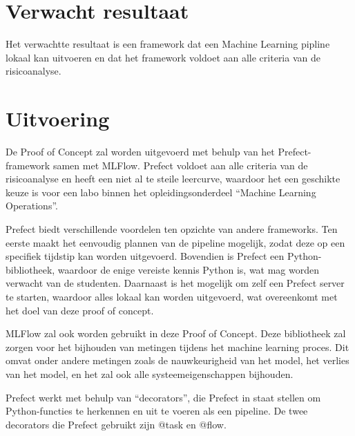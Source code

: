 \section{Verwacht resultaat}


Het verwachtte resultaat is een framework dat een Machine Learning pipline lokaal kan uitvoeren en dat het framework voldoet aan alle criteria van de risicoanalyse.

\section{Uitvoering}


De Proof of Concept zal worden uitgevoerd met behulp van het Prefect-framework samen met MLFlow. Prefect voldoet aan alle criteria van de risicoanalyse en heeft een niet al te steile leercurve, waardoor het een geschikte keuze is voor een labo binnen het opleidingsonderdeel ``Machine Learning Operations''.

Prefect biedt verschillende voordelen ten opzichte van andere frameworks. Ten eerste maakt het eenvoudig plannen van de pipeline mogelijk, zodat deze op een specifiek tijdstip kan worden uitgevoerd. Bovendien is Prefect een Python-bibliotheek, waardoor de enige vereiste kennis Python is, wat mag worden verwacht van de studenten. Daarnaast is het mogelijk om zelf een Prefect server te starten, waardoor alles lokaal kan worden uitgevoerd, wat overeenkomt met het doel van deze proof of concept.

MLFlow zal ook worden gebruikt in deze Proof of Concept. Deze bibliotheek zal zorgen voor het bijhouden van metingen tijdens het machine learning proces. Dit omvat onder andere metingen zoals de nauwkeurigheid van het model, het verlies van het model, en het zal ook alle systeemeigenschappen bijhouden.

Prefect werkt met behulp van ``decorators'', die Prefect in staat stellen om Python-functies te herkennen en uit te voeren als een pipeline. De twee decorators die Prefect gebruikt zijn @task en @flow.

